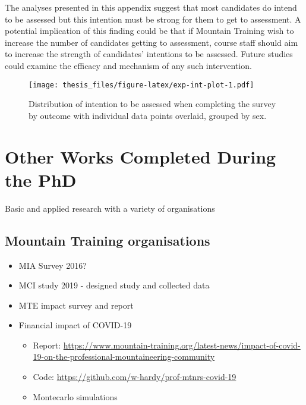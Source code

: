 \documentclass[
  12pt,
  a4paper,
]{book}
\providecommand{\tightlist}{%
  \setlength{\itemsep}{0pt}\setlength{\parskip}{0pt}}
\begin{document}
The analyses presented in this appendix suggest that most candidates do intend to be assessed but this intention must be strong for them to get to assessment. A potential implication of this finding could be that if Mountain Training wish to increase the number of candidates getting to assessment, course staff should aim to increase the strength of candidates' intentions to be assessed. Future studies could examine the efficacy and mechanism of any such intervention.

\begin{figure}
\centering
\texttt{[image: thesis\_files/figure-latex/exp-int-plot-1.pdf]}
\caption{\label{fig:exp-int-plot}Distribution of intention to be assessed when completing the survey by outcome with individual data points overlaid, grouped by sex.}
\end{figure}

\hypertarget{other-works}{%
\chapter{Other Works Completed During the PhD}\label{other-works}}

Basic and applied research with a variety of organisations

\hypertarget{mountain-training-organisations}{%
\section{Mountain Training organisations}\label{mountain-training-organisations}}

\begin{itemize}
\tightlist
\item
  MIA Survey 2016?
\item
  MCI study 2019 - designed study and collected data
\item
  MTE impact survey and report
\item
  Financial impact of COVID-19

  \begin{itemize}
  \tightlist
  \item
    Report: \url{https://www.mountain-training.org/latest-news/impact-of-covid-19-on-the-professional-mountaineering-community}
  \item
    Code: \url{https://github.com/w-hardy/prof-mtnrs-covid-19}
  \item
    Montecarlo simulations
  \end{itemize}
\end{itemize}
\end{document}
